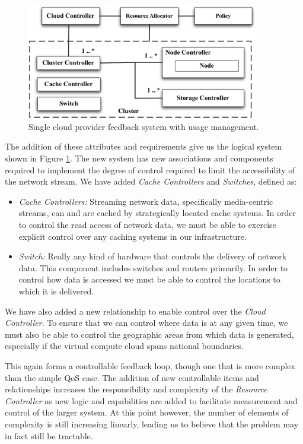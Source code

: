 \documentclass[notitlepage]{book}
\begin{document}
\begin{doublespace}
\begin{figure}[!t]
\centering
\includegraphics[width=4in]{SCP-UM}
\caption{Single cloud provider feedback system with usage management.}
\label{fig:single-um}
\end{figure}

The addition of these attributes and requirements give us the logical system shown in Figure \ref{fig:single-um}.  The new system has new associations and components required to implement the degree of control required to limit the accessibility of the network stream.  We have added \textit{Cache Controllers} and \textit{Switches}, defined as:

\begin{itemize}
\item \textit{Cache Controllers:} Streaming network data, specifically media-centric streams, can and are cached by strategically located cache systems.  In order to control the read access of network data, we must be able to exercise explicit control over any caching systems in our infrastructure.
\item \textit{Switch:} Really any kind of hardware that controls the delivery of network data.  This component includes switches and routers primarily.  In order to control how data is accessed we must be able to control the locations to which it is delivered.
\end{itemize}

We have also added a new relationship to enable control over the \textit{Cloud Controller}.  To ensure that we can control where data is at any given time, we must also be able to control the geographic areas from which data is generated, especially if the virtual compute cloud spans national boundaries.

This again forms a controllable feedback loop, though one that is more complex than the simple QoS case.  The addition of new controllable items and relationships increases the responsibility and complexity of the \textit{Resource Controller} as new logic and capabilities are added to facilitate measurement and control of the larger system.  At this point however, the number of elements of complexity is still increasing linearly, leading us to believe that the problem may in fact still be tractable.


\end{doublespace}
\end{document}
